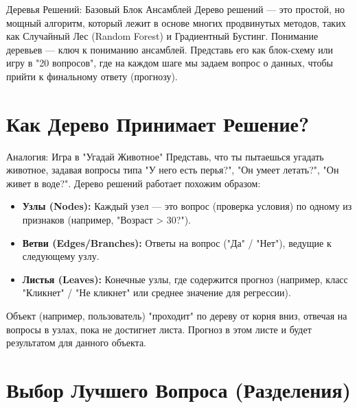 
\begin{textbox}{Деревья Решений: Базовый Блок Ансамблей}
    Дерево решений — это простой, но мощный алгоритм, который лежит в основе многих продвинутых методов, таких как Случайный Лес (Random Forest) и Градиентный Бустинг. Понимание деревьев — ключ к пониманию ансамблей.
    Представь его как блок-схему или игру в "20 вопросов", где на каждом шаге мы задаем вопрос о данных, чтобы прийти к финальному ответу (прогнозу).
\end{textbox}

\section{Как Дерево Принимает Решение?}

\begin{myblock}{Аналогия: Игра в "Угадай Животное"}
    Представь, что ты пытаешься угадать животное, задавая вопросы типа "У него есть перья?", "Он умеет летать?", "Он живет в воде?". Дерево решений работает похожим образом:
    \begin{itemize}
        \item \textbf{Узлы (Nodes):} Каждый узел — это вопрос (проверка условия) по одному из признаков (например, "Возраст > 30?").
        \item \textbf{Ветви (Edges/Branches):} Ответы на вопрос ("Да" / "Нет"), ведущие к следующему узлу.
        \item \textbf{Листья (Leaves):} Конечные узлы, где содержится прогноз (например, класс "Кликнет" / "Не кликнет" или среднее значение для регрессии).
    \end{itemize}
    Объект (например, пользователь) "проходит" по дереву от корня вниз, отвечая на вопросы в узлах, пока не достигнет листа. Прогноз в этом листе и будет результатом для данного объекта.
\end{myblock}

\section{Выбор Лучшего Вопроса (Разделения)}

